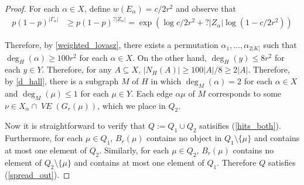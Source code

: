 \documentclass{patmorin}
\DeclareMathOperator{\VE}{\mathit{VE}}
\begin{document}
\begin{proof}
  For each $\alpha\in X$, define $w(E_\alpha)=c/2r^2$ and observe that
  \begin{align*}
    p(1-p)^{|\Gamma_\alpha|}
    & \ge  p(1-p)^{?|Z_\alpha|} = \exp(\log c/2r^2 + ?|Z_\alpha|\log(1-c/2r^2))
  \end{align*}

  Therefore, by \cref{weighted_lovasz}, there exists a permutation $\alpha_1,\ldots,\alpha_{2|K|}$ such that $\deg_H(\alpha)\ge 100r^2$ for each $\alpha\in X$.  On the other hand, $\deg_{H}(y)\le 8r^2$ for each $y\in Y$.  Therefore, for any $A\subseteq X$, $|N_H(A)|\ge 100|A|/8 \ge 2|A|$.  Therefore, by \cref{d_hall}, there is a subgraph $M$ of $H$ in which $\deg_M(\alpha)=2$ for each $\alpha\in X$ and $\deg_M(\mu)\le 1$ for each $\mu\in Y$. Each edge $\alpha\mu$ of $M$ corresponds to some $\nu\in X_\alpha\cap\VE(G_r(\mu))$, which we place in $Q_2$.

  Now it is straightforward to verify that $Q:=Q_1\cup Q_2$ satisifies (\ref{hits_both}).  Furthermore, for each $\mu\in Q_1$, $B_r(\mu)$ contains no object in $Q_1\setminus\{\mu\}$ and contains at most one element of $Q_2$.  Similarly, for each $\mu\in Q_2$, $B_r(\mu)$ contains no element of $Q_2\setminus\{\mu\}$ and contains at most one element of $Q_1$.  Therefore $Q$ satisfies (\ref{spread_out}).
\end{proof}



\newpage
\end{document}
